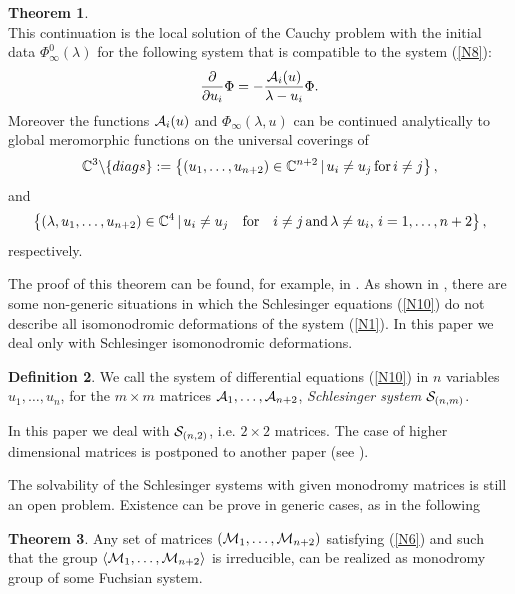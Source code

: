 \documentclass[12pt]{article}
\newcommand{\complessi}{\mathbb C}
\theoremstyle{definition}
\newtheorem{df}{Definition}
\theoremstyle{theorem}
\newtheorem{thm}[df]{Theorem}
\begin{document}
\begin{thm}
\begin{equation}
\end{equation}
This continuation is the local solution of the Cauchy problem with 
the initial data $\Phi_\infty^0(\lambda)$ for the following system 
that is compatible to the system (\ref{N8}):
\begin{equation}
{\partial\over\partial u_i} \Phi = -{ {\cal A}_i(u)\over \lambda-u_i} \Phi.
\end{equation}
Moreover the functions $ {\cal A}_i(u)$ and $\Phi_\infty(\lambda,u)$ can be 
continued analytically to global meromorphic functions on the universal 
coverings of
\begin{equation}
\complessi^3\backslash\{diags\}:=
\left\{(u_1,\dots,u_{n+2})\in\complessi^{n+2}\,|\,u_i\neq u_j\,\hbox{for}\, 
i\neq j\right\},
\end{equation}
and
\begin{equation}
\left\{(\lambda,u_1,\dots,u_{n+2})\in\complessi^4\,
|\,u_i\neq u_j\quad\hbox{for}\quad i\neq j\,\hbox{and}\,
\lambda\neq u_i,\, i=1,\dots,n+2\right\},
\end{equation}
respectively.
\label{thm2.10}
\end{thm}

The proof of this theorem can be found, for example, in \cite{Mal,Mi,Sib}.
As shown in \cite{Bol}, there are some non-generic situations in which 
the Schlesinger equations (\ref{N10}) do not describe all
isomonodromic deformations of the system (\ref{N1}). In this paper we
deal only with Schlesinger isomonodromic deformations.

\begin{df}
We call the system of differential equations (\ref{N10}) in $n$
variables $u_1,\dots,u_n$, for the $m\times m$ matrices 
${\cal A}_1,\dots,{\cal A}_{n+2}$, {\it Schlesinger system} 
${\cal S}_{(n,m)}$. 
\label{df22}
\end{df}

In this paper we deal with ${\cal S}_{(n,2)}$, i.e. $2\times 2$ 
matrices. The case of higher dimensional matrices is postponed to
another paper (see \cite{DM1}).

The solvability of the Schlesinger systems with given monodromy
matrices is still an open problem. Existence can be prove in generic
cases, as in the following

\begin{thm}
Any set of matrices $({\cal M}_1,\dots,{\cal M}_{n+2})$ satisfying (\ref{N6})
and such that the group $\langle{\cal M}_1,\dots,{\cal M}_{n+2}\rangle$ 
is irreducible, can be realized as monodromy group of some Fuchsian
system.
\end{thm}
\end{document}
